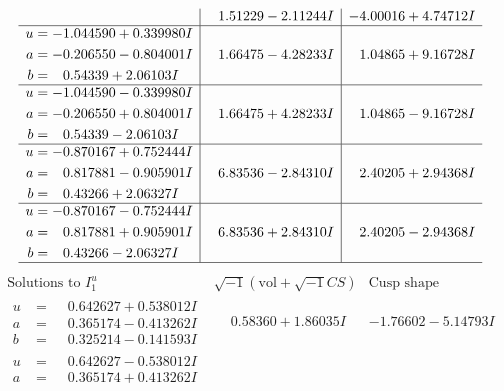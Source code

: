 \documentclass[1p]{elsarticle_modified}
\theoremstyle{definition}
\newcommand{\I}{\sqrt{-1}}
\begin{document}
$$\begin{array}{c|c|c}
 & \phantom{-}1.51229 - 2.11244 I & -4.00016 + 4.74712 I \\ \hline\begin{aligned}
u &= -1.044590 + 0.339980 I \\
a &= -0.206550 - 0.804001 I \\
b &= \phantom{-}0.54339 + 2.06103 I\end{aligned}
 & \phantom{-}1.66475 - 4.28233 I & \phantom{-}1.04865 + 9.16728 I \\ \hline\begin{aligned}
u &= -1.044590 - 0.339980 I \\
a &= -0.206550 + 0.804001 I \\
b &= \phantom{-}0.54339 - 2.06103 I\end{aligned}
 & \phantom{-}1.66475 + 4.28233 I & \phantom{-}1.04865 - 9.16728 I \\ \hline\begin{aligned}
u &= -0.870167 + 0.752444 I \\
a &= \phantom{-}0.817881 - 0.905901 I \\
b &= \phantom{-}0.43266 + 2.06327 I\end{aligned}
 & \phantom{-}6.83536 - 2.84310 I & \phantom{-}2.40205 + 2.94368 I \\ \hline\begin{aligned}
u &= -0.870167 - 0.752444 I \\
a &= \phantom{-}0.817881 + 0.905901 I \\
b &= \phantom{-}0.43266 - 2.06327 I\end{aligned}
 & \phantom{-}6.83536 + 2.84310 I & \phantom{-}2.40205 - 2.94368 I\\
 \hline 
 \end{array}$$\newpage$$\begin{array}{c|c|c}  
\text{Solutions to }I^u_{1}& \I (\text{vol} + \sqrt{-1}CS) & \text{Cusp shape}\\
 \hline 
\begin{aligned}
u &= \phantom{-}0.642627 + 0.538012 I \\
a &= \phantom{-}0.365174 - 0.413262 I \\
b &= \phantom{-}0.325214 - 0.141593 I\end{aligned}
 & \phantom{-}0.58360 + 1.86035 I & -1.76602 - 5.14793 I \\ \hline\begin{aligned}
u &= \phantom{-}0.642627 - 0.538012 I \\
a &= \phantom{-}0.365174 + 0.413262 I \\

\end{aligned}
\end{array}$$
\end{document}
